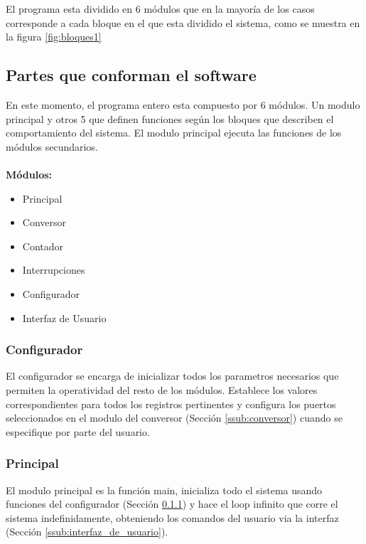 \documentclass{article}
\theoremstyle{definition}
\theoremstyle{remark}
\begin{document}
El programa esta dividido en 6 módulos que en la mayoría de los casos corresponde a cada bloque en el que esta dividido el sistema, como se muestra en la figura \ref{fig:bloques1}

\subsection{Partes que conforman el software} %
\label{sub:partes_que_conforman_el_software}

En este momento, el programa entero esta compuesto por 6 módulos. Un modulo principal y otros 5 que definen funciones según los bloques que describen el comportamiento del sistema. El modulo principal ejecuta las funciones de los módulos secundarios.

\paragraph{}
\textbf{Módulos:}
\begin{itemize}
  \item Principal
  \item Conversor
  \item Contador
  \item Interrupciones
  \item Configurador
  \item Interfaz de Usuario
\end{itemize}


\subsubsection{Configurador} %
\label{ssub:configurador}

El configurador se encarga de inicializar todos los parametros necesarios que permiten la operatividad del resto de los módulos. Establece los valores correspondientes para todos los registros pertinentes y configura los puertos seleccionados en el modulo del conversor (Sección \ref{ssub:conversor}) cuando se especifique por parte del usuario.
\subsubsection{Principal}
El modulo principal es la función main, inicializa todo el sistema usando funciones del configurador (Sección \ref{ssub:configurador}) y hace el loop infinito que corre el sistema indefinidamente, obteniendo los comandos del usuario via la interfaz (Sección \ref{ssub:interfaz_de_usuario}).
\end{document}
